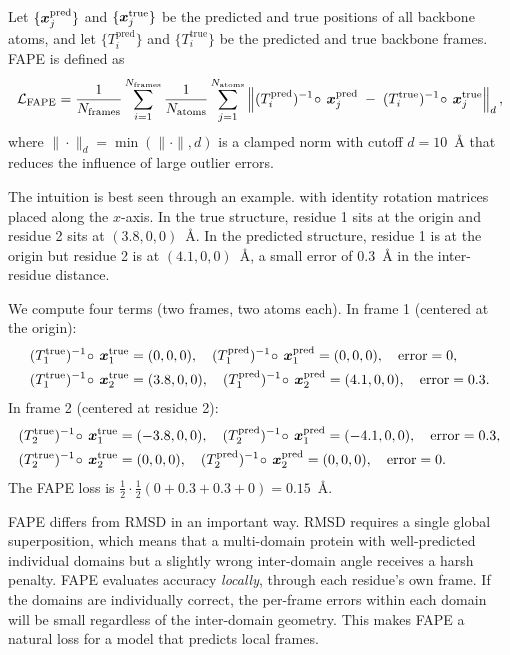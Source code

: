 Let $\{\bm{x}_j^\text{pred}\}$ and $\{\bm{x}_j^\text{true}\}$ be the predicted and true positions of all backbone atoms, and let $\{T_i^\text{pred}\}$ and $\{T_i^\text{true}\}$ be the predicted and true backbone frames.
FAPE is defined as
\begin{equation}
\label{eq:fape}
\mathcal{L}_\text{FAPE} = \frac{1}{N_\text{frames}} \sum_{i=1}^{N_\text{frames}} \frac{1}{N_\text{atoms}} \sum_{j=1}^{N_\text{atoms}} \left\| (T_i^\text{pred})^{-1} \!\circ\, \bm{x}_j^\text{pred} \;-\; (T_i^\text{true})^{-1} \!\circ\, \bm{x}_j^\text{true} \right\|_d,
\end{equation}
where $\|\cdot\|_d = \min(\|\cdot\|, d)$ is a clamped norm with cutoff $d = 10$~\AA{} that reduces the influence of large outlier errors.

The intuition is best seen through an example.
 with identity rotation matrices placed along the $x$-axis.
In the true structure, residue 1 sits at the origin and residue 2 sits at $(3.8, 0, 0)$~\AA.
In the predicted structure, residue 1 is at the origin but residue 2 is at $(4.1, 0, 0)$~\AA{}, a small error of 0.3~\AA{} in the inter-residue distance.

We compute four terms (two frames, two atoms each).
In frame 1 (centered at the origin):
\begin{align*}
(T_1^\text{true})^{-1}\!\circ\,\bm{x}_1^\text{true} &= (0, 0, 0), \quad (T_1^\text{pred})^{-1}\!\circ\,\bm{x}_1^\text{pred} = (0, 0, 0), \quad \text{error} = 0, \\
(T_1^\text{true})^{-1}\!\circ\,\bm{x}_2^\text{true} &= (3.8, 0, 0), \quad (T_1^\text{pred})^{-1}\!\circ\,\bm{x}_2^\text{pred} = (4.1, 0, 0), \quad \text{error} = 0.3.
\end{align*}
In frame 2 (centered at residue 2):
\begin{align*}
(T_2^\text{true})^{-1}\!\circ\,\bm{x}_1^\text{true} &= (-3.8, 0, 0), \quad (T_2^\text{pred})^{-1}\!\circ\,\bm{x}_1^\text{pred} = (-4.1, 0, 0), \quad \text{error} = 0.3, \\
(T_2^\text{true})^{-1}\!\circ\,\bm{x}_2^\text{true} &= (0, 0, 0), \quad (T_2^\text{pred})^{-1}\!\circ\,\bm{x}_2^\text{pred} = (0, 0, 0), \quad \text{error} = 0.
\end{align*}
The FAPE loss is $\frac{1}{2} \cdot \frac{1}{2}(0 + 0.3 + 0.3 + 0) = 0.15$~\AA.

FAPE differs from RMSD in an important way.
RMSD requires a single global superposition, which means that a multi-domain protein with well-predicted individual domains but a slightly wrong inter-domain angle receives a harsh penalty.
FAPE evaluates accuracy \emph{locally}, through each residue's own frame.
If the domains are individually correct, the per-frame errors within each domain will be small regardless of the inter-domain geometry.
This makes FAPE a natural loss for a model that predicts local frames.

